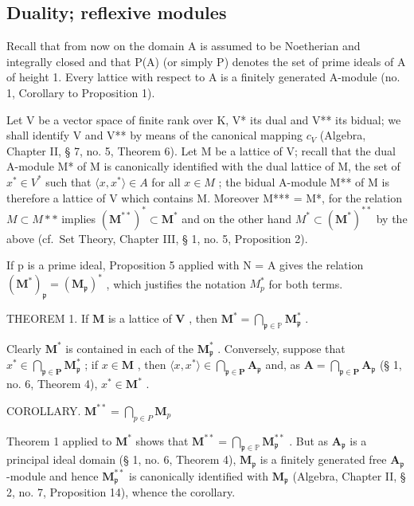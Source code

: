 \subsection{Duality; reflexive modules}

Recall that from now on the domain A is assumed to be Noetherian and integrally closed and that P(A) (or simply P) denotes the set of prime ideals of A of height 1. Every lattice with respect to A is a finitely generated A-module (no. 1, Corollary to Proposition 1).

Let V be a vector space of finite rank over K, V* its dual and V** its bidual; we shall identify V and V** by means of the canonical mapping \(c_{V}\) (Algebra, Chapter II, § 7, no. 5, Theorem 6). Let M be a lattice of V; recall that the dual A-module M* of M is canonically identified with the dual lattice of M, the set of \(x^{*} \in V^{*}\) such that \(\langle x, x^{*} \rangle \in A\) for all \(x \in M\) ; the bidual A-module M** of M is therefore a lattice of V which contains M. Moreover M*** = M*, for the relation \(M \subset M**\) implies \((\mathbf{M}^{**})^{*} \subset \mathbf{M}^{*}\) and on the other hand \(M^{*} \subset (\mathbf{M}^{*})^{**}\) by the above (cf.~Set Theory, Chapter III, § 1, no. 5, Proposition 2).

If p is a prime ideal, Proposition 5 applied with N = A gives the relation \((\mathbf{M}^{*})_{\mathfrak{p}} = (\mathbf{M}_{\mathfrak{p}})^{*}\) , which justifies the notation \(M_{p}^{*}\) for both terms.

THEOREM 1. If \(\mathbf{M}\) is a lattice of \(\mathbf{V}\) , then \(\mathbf{M}^{*} = \bigcap_{\mathfrak{p} \in \mathbb{P}} \mathbf{M}_{\mathfrak{p}}^{*}\) .

Clearly \(\mathbf{M}^*\) is contained in each of the \(\mathbf{M}_{\mathfrak{p}}^{*}\) . Conversely, suppose that \(x^{*} \in \bigcap_{\mathfrak{p} \in \mathbf{P}} \mathbf{M}_{\mathfrak{p}}^{*}\) ; if \(x \in \mathbf{M}\) , then \(\langle x, x^{*} \rangle \in \bigcap_{\mathfrak{p} \in \mathbf{P}} \mathbf{A}_{\mathfrak{p}}\) and, as \(\mathbf{A} = \bigcap_{\mathfrak{p} \in \mathbf{P}} \mathbf{A}_{\mathfrak{p}}\) (§ 1, no. 6, Theorem 4), \(x^{*} \in \mathbf{M}^{*}\) .

COROLLARY. \(\mathbf{M}^{**} = \bigcap_{p \in P}\mathbf{M}_{p}\)

Theorem 1 applied to \(\mathbf{M}^*\) shows that \(\mathbf{M}^{**} = \bigcap_{\mathfrak{p}\in \mathbb{P}}\mathbf{M}_{\mathfrak{p}}^{**}\) . But as \(\mathbf{A}_{\mathfrak{p}}\) is a principal ideal domain (§ 1, no. 6, Theorem 4), \(\mathbf{M}_{\mathfrak{p}}\) is a finitely generated free \(\mathbf{A}_{\mathfrak{p}}\) -module and hence \(\mathbf{M}_{\mathfrak{p}}^{**}\) is canonically identified with \(\mathbf{M}_{\mathfrak{p}}\) (Algebra, Chapter II, § 2, no. 7, Proposition 14), whence the corollary.

